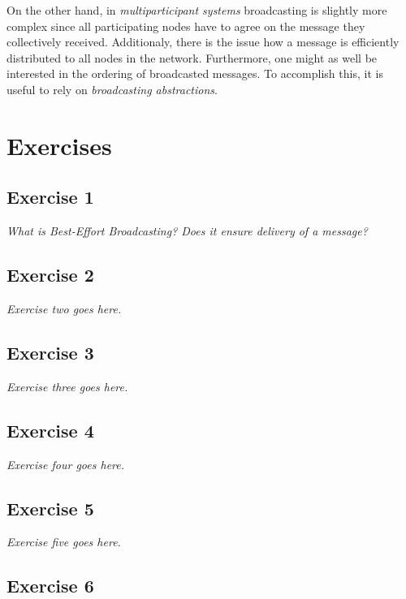On the other hand, in \emph{multiparticipant systems} broadcasting is slightly more complex since all participating nodes have to agree on the message they collectively received. Additionaly, there is the issue how a message is efficiently distributed to all nodes in the network. Furthermore, one might as well be interested in the ordering of broadcasted messages. To accomplish this, it is useful to rely on \emph{broadcasting abstractions}.

\section{Exercises}
\label{sec:exercises}

\subsection*{Exercise 1}
\label{sec:exercise_1}

\emph{What is Best-Effort Broadcasting? Does it ensure delivery of a message?}

\subsection*{Exercise 2}
\label{sec:exercise_2}

\emph{Exercise two goes here.}

\subsection*{Exercise 3}
\label{sec:exercise_3}

\emph{Exercise three goes here.}

\subsection*{Exercise 4}
\label{sec:exercise_4}

\emph{Exercise four goes here.}

\subsection*{Exercise 5}
\label{sec:exercise_5}

\emph{Exercise five goes here.}

\subsection*{Exercise 6}
\label{sec:exercise_6}

